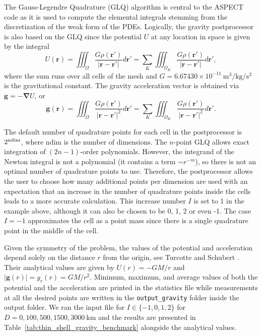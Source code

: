 \documentclass{article}
\newcommand{\aspect}{\textsc{ASPECT}}
\begin{document}
The Gauss-Legendre Quadrature (GLQ) algorithm is central to the \aspect{} code as it is used to compute the elemental integrals stemming from the discretization of the weak form of the PDEs. Logically, the gravity postprocessor is also based on the GLQ since the potential $U$ at any location in space is given by the integral
\begin{equation}
U({\mathbf r}) = \iiint_\Omega \frac{G \rho({\mathbf r}')}{|{\mathbf r}-{\mathbf r}'|} d{\mathbf r}'
= \sum_K \iiint_{\Omega_K} \frac{G \rho({\mathbf r}')}{|{\mathbf r}-{\mathbf r}'|} d{\mathbf r}',
\end{equation}
where the sum runs over all cells of the mesh and ${G}=6.67430\times 10^{-11}~\si{\cubic\meter\per\kg\per\square\second}$ is the gravitational constant. The gravity acceleration vector is obtained via ${\mathbf g}=-{\mathbf \nabla} U$, or
\begin{equation}
{\mathbf g}({\mathbf r}) =
\iiint_\Omega  \frac{G \rho({\mathbf r}')}{|{\mathbf r}-{\mathbf r}'|^2} d{\mathbf r}'
=
\sum_K \iiint_{\Omega_K} \frac{G \rho({\mathbf r}')}{|{\mathbf r}-{\mathbf r}'|^2} d{\mathbf r}'.
\end{equation}

The default number of quadrature points for each cell in the postprocessor is $2\textsuperscript{ndim}$, where ndim is the number of dimensions. The $n$-point GLQ allows exact integration of $(2n-1)$-order polynomials. However, the integrand of the Newton integral is not a polynomial (it contains a term $\sim r^{-m}$), so there is not an optimal number of quadrature points to use. Therefore, the postprocessor allows the user to choose how many additional points per dimension are used with an expectation that an increase in the number of quadrature points inside the cells leads to a more accurate calculation. This increase number $I$ is set to 1 in the example above, although it can also be chosen to be 0, 1, 2 or even -1. The case $I=-1$ approximates the cell as a point mass since there is a single quadrature point in the middle of the cell.

Given the symmetry of the problem, the values of the potential and acceleration depend solely on the distance $r$ from the origin, see Turcotte and Schubert \cite{TS14}. Their analytical values are given by $U(r) = - GM/r$ and $|{\mathbf g}(r)|= g_r(r)=GM/r^2$. 
Minimum, maximum, and average values of both the potential and the acceleration are printed in the statistics file while measurements at all the desired points are written in the \texttt{output\_gravity} folder inside the output folder. We ran the input file for $I\in \{-1,0,1,2\}$ for $D=0,100,500,1500,3000~\si{\km}$ and the results are presented in Table~\ref{tab:thin_shell_gravity_benchmark} alongside the analytical values.
\end{document}
